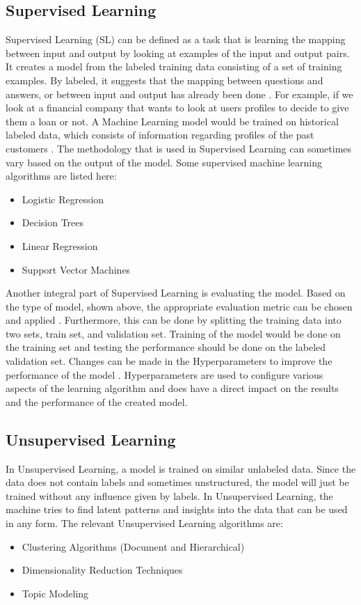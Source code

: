 \subsection{Supervised Learning}
Supervised Learning (SL) can be defined as a task that is learning the mapping between input and output by looking at examples of the input and output pairs. It creates a model from the labeled training data consisting of a set of training examples. By labeled, it suggests that the mapping between questions and answers, or between input and output has already been done \cite{singh2019natural}.
For example, if we look at a financial company that wants to look at users profiles to decide to give them a loan or not. A Machine Learning model would be trained on historical labeled data, which consists of information regarding profiles of the past customers \cite{kotsiantis2007supervised}.
The methodology that is used in Supervised Learning can sometimes vary based on the output of the model. Some supervised machine learning algorithms are listed here:
\begin{itemize}
  \item Logistic Regression
  \item Decision Trees
  \item Linear Regression
  \item Support Vector Machines
\end{itemize}

Another integral part of Supervised Learning is evaluating the model. Based on the type of model, shown above, the appropriate evaluation metric can be chosen and applied \cite{sebastiani2002machine}. Furthermore, this can be done by splitting the training data into two sets, train set, and validation set. Training of the model would be done on the training set and testing the performance should be done on the labeled validation set. Changes can be made in the Hyperparameters to improve the performance of the model \cite{kotsiantis2007supervised}. Hyperparameters are used to configure various aspects of the learning algorithm and does have a direct impact on the results and the performance of the created model. 

\subsection{Unsupervised Learning}
In Unsupervised Learning, a model is trained on similar unlabeled data. Since the data does not contain labels and sometimes unstructured, the model will just be trained without any influence given by labels. In Unsupervised Learning, the machine tries to find latent patterns and insights into the data that can be used in any form. The relevant Unsupervised Learning algorithms are:
\begin{itemize}
\item Clustering Algorithms (Document and Hierarchical)
\item Dimensionality Reduction Techniques
\item Topic Modeling
\end{itemize}


